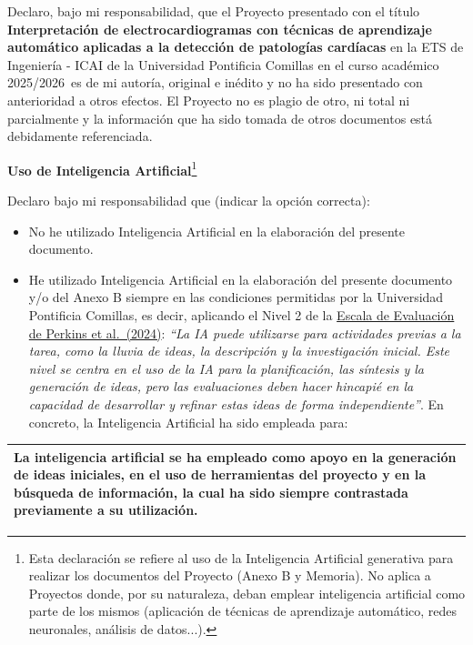 \documentclass[12pt,a4paper,twoside]{book}
\newcommand{\projectTitle}{Interpretación de electrocardiogramas con técnicas de aprendizaje automático aplicadas a la detección de patologías cardíacas}
\newcommand{\BeginYear}{2025}
\newcommand{\EndYear}{2026}
\begin{document}
{\fontsize{11}{15}\selectfont
    Declaro, bajo mi responsabilidad, que el Proyecto presentado con el t\'itulo \textbf{\projectTitle} en la ETS de Ingenier\'ia - ICAI de la Universidad Pontificia Comillas en el curso acad\'emico \BeginYear/\EndYear\ es de mi autor\'ia, original e in\'edito y no ha sido presentado con anterioridad a otros efectos. El Proyecto no es plagio de otro, ni total ni parcialmente y la informaci\'on que ha sido tomada de otros documentos est\'a debidamente referenciada.
    \vspace{5mm}

    \begin{center}
        {\large \textbf{Uso de Inteligencia Artificial}}\footnote{Esta declaraci\'on se refiere al uso de la Inteligencia Artificial generativa para realizar los documentos del Proyecto (Anexo B y Memoria). No aplica a Proyectos donde, por su naturaleza, deban emplear inteligencia artificial como parte de los mismos (aplicaci\'on de t\'ecnicas de aprendizaje autom\'atico, redes neuronales, an\'alisis de datos...).}
    \end{center}

    Declaro bajo mi responsabilidad que (indicar la opci\'on correcta):

    \begin{itemize}
        \item[$\square$] %
        No he utilizado Inteligencia Artificial en la elaboraci\'on del presente documento.
    
        \item[$\boxtimes$] %
        He utilizado Inteligencia Artificial en la elaboraci\'on del presente documento y/o del Anexo B siempre en las condiciones permitidas por la Universidad Pontificia Comillas, es decir, aplicando el Nivel 2 de la \href{https://aiassessmentscale.com/}{Escala de Evaluaci\'on de Perkins et al.\ (2024)}: \emph{``La IA puede utilizarse para actividades previas a la tarea, como la lluvia de ideas, la descripci\'on y la investigaci\'on inicial. Este nivel se centra en el uso de la IA para la planificaci\'on, las s\'intesis y la generaci\'on de ideas, pero las evaluaciones deben hacer hincapi\'e en la capacidad de desarrollar y refinar estas ideas de forma independiente''}. En concreto, la Inteligencia Artificial ha sido empleada para:
    \end{itemize}
    
    \begin{center}
    \renewcommand{\arraystretch}{3}
    \begin{tabular}{|p{\textwidth}|}
    \hline
    La inteligencia artificial se ha empleado como apoyo en la generación de ideas iniciales, en el uso de herramientas del proyecto y en la búsqueda de información, la cual ha sido siempre contrastada previamente a su utilización.
    \vspace{4cm} \\
    \hline
    \end{tabular}
    \end{center}
    
}
\end{document}
